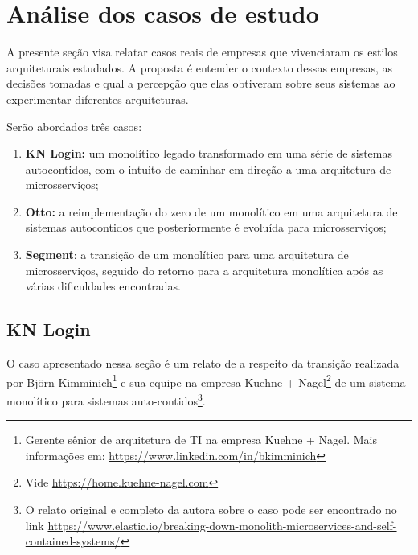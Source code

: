 
\section{Análise dos casos de estudo}

A presente seção visa relatar casos reais de empresas que vivenciaram os estilos arquiteturais
estudados. A proposta é entender o contexto dessas empresas, as decisões tomadas e qual a percepção
que elas obtiveram sobre seus sistemas ao experimentar diferentes arquiteturas.

Serão abordados três casos:

\begin{enumerate}
    \item \textbf{KN Login:} um monolítico legado transformado em uma série de sistemas
        autocontidos, com o intuito de caminhar em direção a uma arquitetura de microsserviços;
    \item \textbf{Otto:} a reimplementação do zero de um monolítico em uma arquitetura de sistemas
        autocontidos que posteriormente é evoluída para microsserviços;
    \item \textbf{Segment}: a transição de um monolítico para uma arquitetura de microsserviços,
        seguido do retorno para a arquitetura monolítica após as várias dificuldades encontradas.
\end{enumerate}

\subsection{KN Login}
\label{sec:KNLogin}

O caso apresentado nessa seção é um relato de  a respeito
da transição realizada por Björn Kimminich\footnote{Gerente sênior de arquitetura de TI na empresa
Kuehne + Nagel. Mais informações em: \url{https://www.linkedin.com/in/bkimminich}} e sua equipe na empresa
Kuehne + Nagel\footnote{Vide \url{https://home.kuehne-nagel.com}} de um sistema monolítico para sistemas
auto-contidos\footnote{O relato original e completo da autora sobre o caso pode ser encontrado no link
\url{https://www.elastic.io/breaking-down-monolith-microservices-and-self-contained-systems/}}. 

